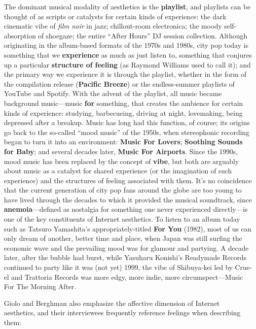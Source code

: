 \documentclass[
  letterpaper,
  DIV=11,
  numbers=noendperiod,
  oneside]{scrartcl}
\begin{document}
The dominant musical modality of aesthetics is the \textbf{playlist},
and playlists can be thought of as scripts or catalysts for certain
kinds of experience: the dark cinematic vibe of \emph{film noir} in
jazz; chillout-room electronica; the moody self-absorption of shoegaze;
the entire ``After Hours'' DJ session collection. Although originating
in the album-based formats of the 1970s and 1980s, city pop today is
something that we \textbf{experience} as much as just listen to,
something that conjures up a particular \textbf{structure of feeling}
(as Raymond Williams used to call it); and the primary way we experience
it is through the playlist, whether in the form of the compilation
release (\textbf{Pacific Breeze}) or the endless-summer playlists of
YouTube and Spotify. With the advent of the playlist, all music became
background music---music \textbf{for} something, that creates the
ambience for certain kinds of experience: studying, barbecueing, driving
at night, lovemaking, being depressed after a breakup. Music has long
had this function, of course; its origins go back to the so-called
``mood music'' of the 1950s, when stereophonic recording began to turn
it into an environment: \textbf{Music For Lovers}; \textbf{Soothing
Sounds for Baby}; and several decades later, \textbf{Music For
Airports}. Since the 1990s, mood music has been replaced by the concept
of \textbf{vibe}, but both are arguably about music as a catalyst for
shared experience (or the imagination of such experience) and the
structures of feeling associated with them. It's no coincidence that the
current generation of city pop fans around the globe are too young to
have lived through the decades to which it provided the musical
soundtrack, since \textbf{anemoia}---defined as nostalgia for something
one never experienced directly---is one of the key constituents of
Internet aesthetics. To listen to an album today such as Tatsuro
Yamashita's appropriately-titled \textbf{For You} (1982), most of us can
only dream of another, better time and place, when Japan was still
surfing the economic wave and the prevailing mood was for glamour and
partying. A decade later, after the bubble had burst, while Yasuharu
Konishi's Readymade Records continued to party like it was (not yet)
1999, the vibe of Shibuya-kei led by Crue-el and Trattoria Records was
more edgy, more indie, more circumspect---Music For The Morning After.

Giolo and Berghman also emphasize the affective dimension of Internet
aesthetics, and their interviewees frequently reference feelings when
describing them:
\end{document}
